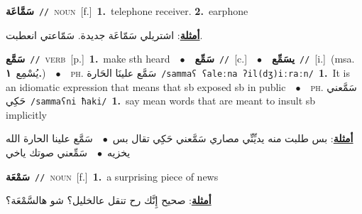 \documentclass[10pt,a4paper,twoside]{article} %
\begin{document}
\begin{multicols}{2}
{\setlength\topsep{0pt}\textbf{\foreignlanguage{arabic}{سَمَّاعَة}}\ {\color{gray}\texttt{//}\color{black}}\ \textsc{noun}\ [f.]\ \textbf{1.}~telephone receiver.  \textbf{2.}~earphone\  \begin{flushright}\color{gray}\foreignlanguage{arabic}{\textbf{\underline{\foreignlanguage{arabic}{أمثلة}}}: اشتريلي سَمّاعَة جديدة. سَمّاعتي انعطبت.}\end{flushright}\color{black}} \vspace{2mm}

{\setlength\topsep{0pt}\textbf{\foreignlanguage{arabic}{سَمَّع}}\ {\color{gray}\texttt{//}\color{black}}\ \textsc{verb}\ [p.]\ \textbf{1.}~make sth heard\ \ $\bullet$\ \ \setlength\topsep{0pt}\textbf{\foreignlanguage{arabic}{سَمِّع}}\ {\color{gray}\texttt{//}\color{black}}\ [c.]\ \ $\bullet$\ \ \setlength\topsep{0pt}\textbf{\foreignlanguage{arabic}{يسَمِّع}}\ {\color{gray}\texttt{//}\color{black}}\ [i.]\ \color{gray}(msa. \foreignlanguage{arabic}{يُسْمِع}~\foreignlanguage{arabic}{\textbf{١.}})\color{black}\ \ $\bullet$\ \ \textsc{ph.} \color{gray} \foreignlanguage{arabic}{سَمَّع علينَا الحَارة}\color{black}\ {\color{gray}\texttt{/{\sffamily sammaʕ ʕaleːna ʔil(dʒ)iːraːn}/}\color{black}}\ \textbf{1.}~It is an idiomatic expression that means that sb exposed sb in public\ \ $\bullet$\ \ \textsc{ph.} \color{gray} \foreignlanguage{arabic}{سَمَّعني حَكِي}\color{black}\ {\color{gray}\texttt{/{\sffamily sammaʕni ħaki}/}\color{black}}\ \textbf{1.}~say mean words that are meant to insult sb implicitly\  \begin{flushright}\color{gray}\foreignlanguage{arabic}{\textbf{\underline{\foreignlanguage{arabic}{أمثلة}}}: بس طلبت منه يديِّنِّي مصاري سَمَّعني حَكِي تقال بس\ $\bullet$\ \  سَمَّع علينا الحارة الله يخزيه\ $\bullet$\ \  سَمِّعني صوتك ياخي}\end{flushright}\color{black}} \vspace{2mm}

{\setlength\topsep{0pt}\textbf{\foreignlanguage{arabic}{سَمْعَة}}\ {\color{gray}\texttt{//}\color{black}}\ \textsc{noun}\ [f.]\ \textbf{1.}~a surprising piece of news\  \begin{flushright}\color{gray}\foreignlanguage{arabic}{\textbf{\underline{\foreignlanguage{arabic}{أمثلة}}}: صحيح إِنَّك رح تنقل عالخليل؟ شو هالسَّمْعَة؟}\end{flushright}\color{black}} \vspace{2mm}


\end{multicols}
\end{document}

